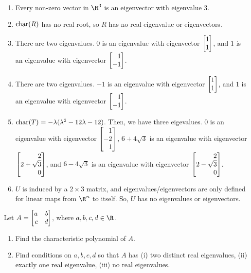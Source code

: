 \begin{exercises}
\begin{problist}
		\begin{solution}
		    \begin{enumerate}
		        \item Every non-zero vector in $\R^3$ is an eigenvector with eigenvalue 3.
		        \item $\operatorname{char}(R)$ has no real root, so $R$ has no real eigenvalue or eigenvectors.
		        \item There are two eigenvalues. $0$ is an eigenvalue with eigenvector $\mat{1 \\ 1}$, and $1$ is an eigenvalue with eigenvector $\mat{1\\-1}$.
		        \item There are two eigenvalues. $-1$ is an eigenvalue with eigenvector $\mat{1\\1}$, and $1$ is an eigenvalue with eigenvector $\mat{1 \\ -1}$.
		        \item $\operatorname{char}(T) = - \lambda ( \lambda^2 - 12 \lambda - 12)$. Then, we have three eigevalues. $0$ is an eigenvalue with eigenvector $\mat{1 \\ -2 \\ 1}$, $6 + 4 \sqrt{3}$ is an eigenvalue with eigenvector $\mat{2 \\ 2 + \sqrt{3} \\ 0}$, and $6 - 4\sqrt{3}$ is an eigenvalue with eigenvector $\mat{2 \\ 2 - \sqrt{3} \\ 0}$.
		        \item $U$ is induced by a $2 \times 3$ matrix, and eigenvalues/eigenvectors are only defined for linear maps from $\R^n$ to itself. So, $U$ has no eigenvalues or eigenvectors.
		    \end{enumerate}
		\end{solution}

		\prob Let $A = \mat{a&b\\c&d}$, where $a,b,c,d \in \R$.
		\begin{enumerate}
			\item Find the characteristic polynomial of $A$.
		
			\item Find conditions on $a,b,c,d$ so that $A$ has (i) two distinct
				real eigenvalues, (ii) exactly one real eigenvalue, (iii) no
				real eigenvalues.
		\end{enumerate}


\end{problist}
\end{exercises}
